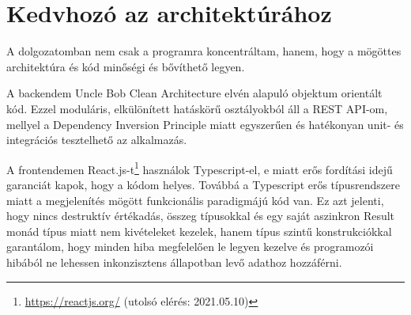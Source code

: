 \section{Kedvhozó az architektúrához}
A dolgozatomban nem csak a programra koncentráltam, hanem, hogy a mögöttes architektúra és kód minőségi és bővíthető legyen.

A backendem Uncle Bob Clean Architecture\cite{cleanArchitecturePost} elvén alapuló objektum orientált kód. Ezzel moduláris, elkülönített hatáskörű osztályokból áll a REST API-om, mellyel a Dependency Inversion Principle miatt egyszerűen és hatékonyan unit- és integrációs tesztelhető az alkalmazás.

A frontendemen React.js-t\footnote{\url{https://reactjs.org/} (utolsó elérés: 2021.05.10)} használok Typescript-el, e miatt erős fordítási idejű garanciát kapok, hogy a kódom helyes. Továbbá a Typescript erős típusrendszere miatt a megjelenítés mögött funkcionális paradigmájú kód van. Ez azt jelenti, hogy nincs destruktív értékadás, összeg típusokkal és egy saját aszinkron Result monád típus miatt nem kivételeket kezelek, hanem típus szintű konstrukciókkal garantálom, hogy minden hiba megfelelően le legyen kezelve és programozói hibából ne lehessen inkonzisztens állapotban levő adathoz hozzáférni.
